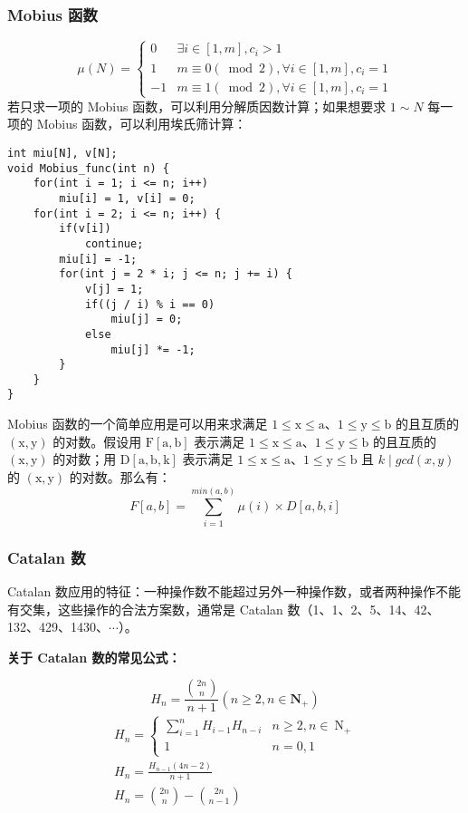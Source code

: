\documentclass[UTF8]{article}
\begin{document}
\subsubsection{Mobius 函数}
$$
\mu(N)=\left\{\begin{array}{cc}
0 & \exists i \in[1, m], c_i>1 \\
1 & m \equiv 0(\bmod 2), \forall i \in[1, m], c_i=1 \\
-1 & m \equiv 1(\bmod 2), \forall i \in[1, m], c_i=1
\end{array}\right.
$$
若只求一项的 Mobius 函数，可以利用分解质因数计算；如果想要求 $1 \sim N$ 每一项的 Mobius 函数，可以利用埃氏筛计算：
\begin{lstlisting}[caption=利用埃氏筛计算 $1 \sim N$ 的 Mobius 函数]
int miu[N], v[N];
void Mobius_func(int n) {
	for(int i = 1; i <= n; i++)
		miu[i] = 1, v[i] = 0;
	for(int i = 2; i <= n; i++) {
		if(v[i])
			continue;
		miu[i] = -1;
		for(int j = 2 * i; j <= n; j += i) {
			v[j] = 1;
			if((j / i) % i == 0)
				miu[j] = 0;
			else
				miu[j] *= -1;
		}
	}
}
\end{lstlisting}

Mobius 函数的一个简单应用是可以用来求满足 $\mathrm{1 \le x \le a}$、$\mathrm{1 \le y \le b}$ 的且互质的 $\mathrm{(x, y)}$ 的对数。假设用 $\mathrm{F[a, b]}$ 表示满足 $\mathrm{1 \le x \le a}$、$\mathrm{1 \le y \le b}$ 的且互质的 $\mathrm{(x, y)}$ 的对数；用 $\mathrm{D[a, b, k]}$ 表示满足 $\mathrm{1 \le x \le a}$、$\mathrm{1 \le y \le b}$ 且 $k \mid gcd(x, y)$ 的 $\mathrm{(x, y)}$ 的对数。那么有：
$$
F[a, b] = \sum_{i = 1}^{min(a, b)} \mu(i) \times D[a, b, i]
$$


\subsubsection{Catalan 数}
Catalan 数应用的特征：一种操作数不能超过另外一种操作数，或者两种操作不能有交集，这些操作的合法方案数，通常是 Catalan 数（1、1、2、5、14、42、132、429、1430、$\cdots$）。

\noindent \textbf{关于 Catalan 数的常见公式：}

$$
H_n=\frac{\binom{2 n}{n}}{n+1}\left(n \geq 2, n \in \mathbf{N}_{+}\right)
$$
$$
\begin{gathered}
H_n= \begin{cases}\sum_{i=1}^n H_{i-1} H_{n-i} & n \geq 2, n \in \mathrm{~N}_{+} \\
1 & n=0,1\end{cases} \\
H_n=\frac{H_{n-1}(4 n-2)}{n+1} \\
H_n=\binom{2 n}{n}-\binom{2 n}{n-1}
\end{gathered}
$$
\end{document}
